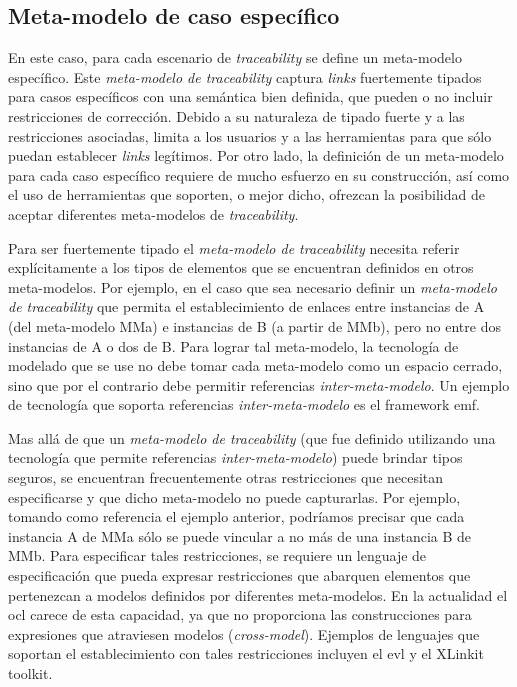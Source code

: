 \documentclass[a4paper,12pt,oneside,spanish]{book}
\begin{document}
\subsection{Meta-modelo de caso específico}

En este caso, para cada escenario de \textit{traceability} se define un meta-modelo específico. Este \textit{meta-modelo de traceability} captura \textit{links} fuertemente tipados para casos específicos con una semántica bien definida, que pueden o no incluir restricciones de corrección. Debido a su naturaleza de tipado fuerte y a las restricciones asociadas, limita a los usuarios y a las herramientas para que sólo puedan establecer \textit{links} legítimos. Por otro lado, la definición de un meta-modelo para cada caso específico requiere de mucho esfuerzo en su construcción, así como el uso de herramientas que soporten, o mejor dicho, ofrezcan la posibilidad de aceptar diferentes meta-modelos de \textit{traceability}.

Para ser fuertemente tipado el \textit{meta-modelo de traceability} necesita referir explícitamente a los tipos de elementos que se encuentran definidos en otros meta-modelos. Por ejemplo, en el caso que sea necesario definir un \textit{meta-modelo de traceability} que permita el establecimiento de enlaces entre instancias de \textsf{A} (del meta-modelo \textsf{MMa}) e instancias de \textsf{B} (a partir de \textsf{MMb}), pero no entre dos instancias de \textsf{A} o dos de \textsf{B}. Para lograr tal meta-modelo, la tecnología de modelado que se use no debe tomar cada meta-modelo como un espacio cerrado, sino que por el contrario debe permitir referencias \textit{inter-meta-modelo}. Un ejemplo de tecnología que soporta referencias \textit{inter-meta-modelo} es el framework \gls{emf}.

Mas allá de que un \textit{meta-modelo de traceability} (que fue definido utilizando una tecnología que permite referencias \textit{inter-meta-modelo}) puede brindar tipos seguros, se encuentran frecuentemente otras restricciones que necesitan especificarse y que dicho meta-modelo no puede capturarlas. Por ejemplo, tomando como referencia el ejemplo anterior, podríamos precisar que cada instancia \textsf{A} de \textsf{MMa} sólo se puede vincular a no más de una instancia \textsf{B} de \textsf{MMb}. Para especificar tales restricciones, se requiere un lenguaje de especificación que pueda expresar restricciones que abarquen elementos que pertenezcan a modelos definidos por diferentes meta-modelos. En la actualidad el \gls{ocl} carece de esta capacidad, ya que no proporciona las construcciones para expresiones que atraviesen modelos (\textit{cross-model}). Ejemplos de lenguajes que soportan el establecimiento con tales restricciones incluyen el \gls{evl} y el XLinkit toolkit.
\end{document}
